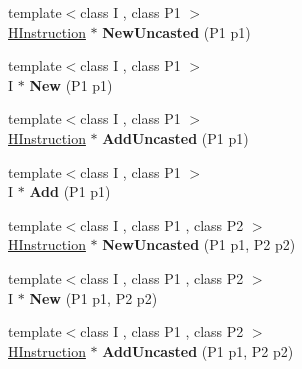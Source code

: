 \begin{DoxyCompactItemize}
\item 
{\footnotesize template$<$class I , class P1 $>$ }\\\hyperlink{classv8_1_1internal_1_1_h_instruction}{H\+Instruction} $\ast$ {\bfseries New\+Uncasted} (P1 p1)\hypertarget{classv8_1_1internal_1_1_h_graph_builder_ad2e27f0614e05c78dfb90d6520a278de}{}\label{classv8_1_1internal_1_1_h_graph_builder_ad2e27f0614e05c78dfb90d6520a278de}

\item 
{\footnotesize template$<$class I , class P1 $>$ }\\I $\ast$ {\bfseries New} (P1 p1)\hypertarget{classv8_1_1internal_1_1_h_graph_builder_af0bdf90d8159037ff8e4295a5a9eddfb}{}\label{classv8_1_1internal_1_1_h_graph_builder_af0bdf90d8159037ff8e4295a5a9eddfb}

\item 
{\footnotesize template$<$class I , class P1 $>$ }\\\hyperlink{classv8_1_1internal_1_1_h_instruction}{H\+Instruction} $\ast$ {\bfseries Add\+Uncasted} (P1 p1)\hypertarget{classv8_1_1internal_1_1_h_graph_builder_a0a8366a2feb984425d6671cb78157e81}{}\label{classv8_1_1internal_1_1_h_graph_builder_a0a8366a2feb984425d6671cb78157e81}

\item 
{\footnotesize template$<$class I , class P1 $>$ }\\I $\ast$ {\bfseries Add} (P1 p1)\hypertarget{classv8_1_1internal_1_1_h_graph_builder_a7d6a298ab96376633d2cd8dd7cc1f618}{}\label{classv8_1_1internal_1_1_h_graph_builder_a7d6a298ab96376633d2cd8dd7cc1f618}

\item 
{\footnotesize template$<$class I , class P1 , class P2 $>$ }\\\hyperlink{classv8_1_1internal_1_1_h_instruction}{H\+Instruction} $\ast$ {\bfseries New\+Uncasted} (P1 p1, P2 p2)\hypertarget{classv8_1_1internal_1_1_h_graph_builder_a10cad3de4825148ab4c93b69416e819f}{}\label{classv8_1_1internal_1_1_h_graph_builder_a10cad3de4825148ab4c93b69416e819f}

\item 
{\footnotesize template$<$class I , class P1 , class P2 $>$ }\\I $\ast$ {\bfseries New} (P1 p1, P2 p2)\hypertarget{classv8_1_1internal_1_1_h_graph_builder_aae2acabd10188a0a55dd4840b29f6baf}{}\label{classv8_1_1internal_1_1_h_graph_builder_aae2acabd10188a0a55dd4840b29f6baf}

\item 
{\footnotesize template$<$class I , class P1 , class P2 $>$ }\\\hyperlink{classv8_1_1internal_1_1_h_instruction}{H\+Instruction} $\ast$ {\bfseries Add\+Uncasted} (P1 p1, P2 p2)\hypertarget{classv8_1_1internal_1_1_h_graph_builder_a48a8c0ed3a6c2363a1cafba9b4223a37}{}\label{classv8_1_1internal_1_1_h_graph_builder_a48a8c0ed3a6c2363a1cafba9b4223a37}


\end{DoxyCompactItemize}
